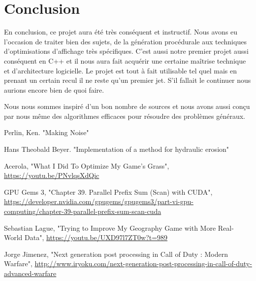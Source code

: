 \documentclass{EPUProjetDi}
\begin{document}
\chapter*{Conclusion}

En conclusion, ce projet aura été très conséquent et instructif. Nous avons eu l'occasion de traiter bien des sujets, de la génération procédurale aux techniques d'optimisations d'affichage  très spécifiques. C'est aussi notre premier projet aussi conséquent en C++ et il nous aura fait acquérir une certaine maîtrise technique et d'architecture logicielle. Le projet est tout à fait utilisable tel quel mais en prenant un certain recul il ne reste qu'un premier jet. S'il fallait le continuer nous aurions encore bien de quoi faire.

Nous nous sommes inspiré d'un bon nombre de sources et nous avons aussi conçu par nous même des algorithmes efficaces pour résoudre des problèmes généraux.




\begin{thebibliography}{9}
Perlin, Ken. "Making Noise"

Hans Theobald Beyer. "Implementation of a method for hydraulic erosion"

Acerola, "What I Did To Optimize My Game's Grass", \url{https://youtu.be/PNvlqsXdQic}

GPU Gems 3, "Chapter 39. Parallel Prefix Sum (Scan) with CUDA", \url{https://developer.nvidia.com/gpugems/gpugems3/part-vi-gpu-computing/chapter-39-parallel-prefix-sum-scan-cuda}

Sebastian Lague, "Trying to Improve My Geography Game with More Real-World Data", \url{https://youtu.be/UXD97l7ZT0w?t=989}


Jorge Jimenez, "Next generation post processing in Call of Duty : Modern Warfare", \url{http://www.iryoku.com/next-generation-post-processing-in-call-of-duty-advanced-warfare}



\end{thebibliography}


\end{document}

